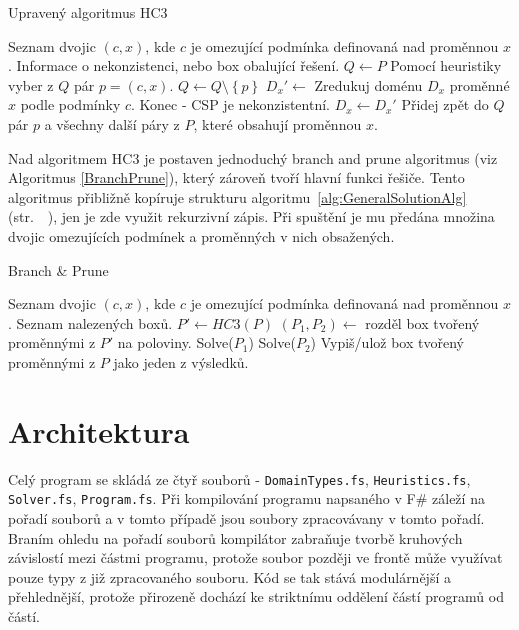 \begin{algorithm}
\caption{Upravený algoritmus HC3}
\label{HC3AlgorithmAltered}
\begin{algorithmic}[1]
\Require Seznam dvojic $(c, x)$, kde $c$ je omezující podmínka definovaná nad proměnnou $x$.
\Ensure Informace o nekonzistenci, nebo box obalující řešení.
\State $Q \gets P$
\State Pomocí heuristiky vyber z $Q$ pár $p = (c, x)$.
\State $Q \gets Q \setminus \left\{ p \right\}$
\State $D_x' \gets$ Zredukuj doménu $D_x$ proměnné $x$ podle podmínky $c$.
\State Konec - CSP je nekonzistentní.
\EndIf
{}
\State $D_x \gets D_x'$
\State Přidej zpět do $Q$ pár $p$ a všechny další páry z $P$, které obsahují proměnnou $x$.
\EndIf
\EndWhile
\EndProcedure
\end{algorithmic}
\end{algorithm}

Nad algoritmem HC3 je postaven jednoduchý branch and prune algoritmus (viz Algoritmus \ref{BranchPrune}), který zároveň tvoří hlavní funkci řešiče. Tento algoritmus přibližně kopíruje strukturu algoritmu~\ref{alg:GeneralSolutionAlg} (str.~~\pageref{alg:GeneralSolutionAlg}), jen je zde využit rekurzivní zápis. Při spuštění je mu předána množina dvojic omezujících podmínek a proměnných v nich obsažených.

\begin{algorithm}
\caption{Branch \& Prune}
\label{BranchPrune}
\begin{algorithmic}[1]
\Require Seznam dvojic $(c, x)$, kde $c$ je omezující podmínka definovaná nad proměnnou $x$.
\Ensure Seznam nalezených boxů.
\State $P' \gets HC3(P)$
\State $(P_1, P_2) \gets $ rozděl box tvořený proměnnými z $P'$ na poloviny.
\State Solve($P_1$)
\State Solve($P_2$)
\Else
\State Vypiš/ulož box tvořený proměnnými z $P$ jako jeden z výsledků.
\EndIf
\EndProcedure
\end{algorithmic}
\end{algorithm}

\section{Architektura}
Celý program se skládá ze čtyř souborů - \verb|DomainTypes.fs|, \verb|Heuristics.fs|, \verb|Solver.fs|, \verb|Program.fs|. Při kompilování programu napsaného v F\# záleží na pořadí souborů a v tomto případě jsou soubory zpracovávany v tomto pořadí. Braním ohledu na pořadí souborů kompilátor zabraňuje tvorbě kruhových závislostí mezi částmi programu, protože soubor později ve frontě může využívat pouze typy z již zpracovaného souboru. Kód se tak stává modulárnější a přehlednější, protože přirozeně dochází ke striktnímu oddělení  částí programů od  částí.

